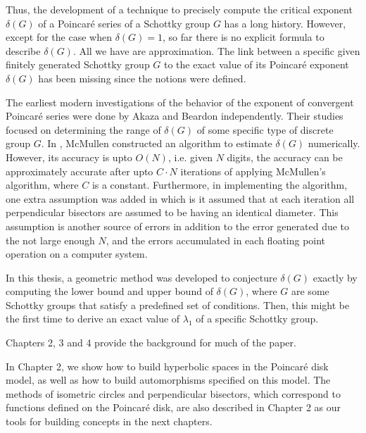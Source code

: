 \documentclass[12pt,oneside]{sfsuthesis}
\theoremstyle{plain} %
\theoremstyle{definition}  %
\theoremstyle{remark}  %
\theoremstyle{plain}
\begin{document}
{Thus, the development of a technique to precisely compute the critical exponent $\delta(G)$ of a Poincar\'{e} series of a Schottky group $G$ has a long history. However, except for the case when $\delta(G)=1$, so far there is no explicit formula to describe $\delta(G)$. All we have are approximation. The link between a specific given finitely generated Schottky group $G$ to the exact value of its Poincar\'{e} exponent $\delta(G)$ has been missing since the notions were defined. 


The earliest modern investigations of the behavior of the exponent of convergent Poincar\'{e} series were done by Akaza and Beardon independently\cite{akaza1964poincara, akaza1966singular, beardon1966hausdorff, beardon1968exponent, beardon1971inequalities}. Their studies focused on determining the range of $\delta(G)$ of some specific type of discrete group $G$. In \cite{mcmullen1998hausdorff}, McMullen constructed an algorithm to estimate $\delta(G)$ numerically. However, its accuracy is upto $O(N)$, i.e. given $N$ digits, the accuracy can be approximately accurate after upto $C\cdot N$ iterations of applying McMullen's algorithm, where $C$ is a constant. Furthermore, in implementing the algorithm, one extra assumption was added in \cite{mcmullen1998hausdorff} which is it assumed that at each iteration all perpendicular bisectors are assumed to be having an identical diameter. This assumption is another source of errors in addition to the error generated due to the not large enough $N$, and the errors accumulated in each floating point operation on a computer system.


In this thesis, a geometric method was developed to conjecture $\delta(G)$ exactly by computing the lower bound and upper bound of $\delta(G)$, where $G$ are some Schottky groups that satisfy a predefined set of conditions. Then, this might be the first time to derive an exact value of $\lambda_1$ of a specific Schottky group. 



Chapters 2, 3 and 4 provide the background for much of the paper. 

In Chapter 2, we show how to build hyperbolic spaces in the Poincar\'{e} disk model, as well as how to build automorphisms specified on this model. The methods of isometric circles and perpendicular bisectors, which correspond to functions defined on the Poincar\'{e} disk, are also described in Chapter 2 as our tools for building concepts in the next chapters.


}
\end{document}
